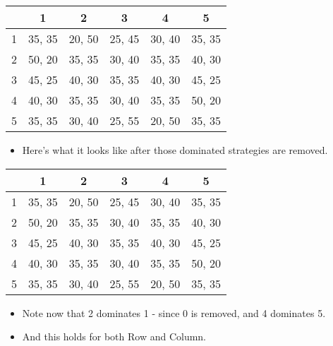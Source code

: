 \documentclass[
  ignorenonframetext,
]{beamer}
\providecommand{\tightlist}{%
  \setlength{\itemsep}{0pt}\setlength{\parskip}{0pt}}
\begin{document}
\begin{frame}
\begin{table}[!h]
\centering
\begin{tabular}[t]{>{}r|ccccc}
\toprule
 & 1 & 2 & 3 & 4 & 5\\
\midrule
1 & 35, 35 & 20, 50 & 25, 45 & 30, 40 & 35, 35\\
2 & 50, 20 & 35, 35 & 30, 40 & 35, 35 & 40, 30\\
3 & 45, 25 & 40, 30 & 35, 35 & 40, 30 & 45, 25\\
4 & 40, 30 & 35, 35 & 30, 40 & 35, 35 & 50, 20\\
5 & 35, 35 & 30, 40 & 25, 55 & 20, 50 & 35, 35\\
\bottomrule
\end{tabular}
\end{table}

\begin{itemize}
\tightlist
\item
  Here's what it looks like after those dominated strategies are
  removed.
\end{itemize}
\end{frame}

\begin{frame}
\begin{table}[!h]
\centering
\begin{tabular}[t]{>{}r|ccccc}
\toprule
 & 1 & 2 & 3 & 4 & 5\\
\midrule
1 & 35, 35 & 20, 50 & 25, 45 & 30, 40 & 35, 35\\
2 & 50, 20 & 35, 35 & 30, 40 & 35, 35 & 40, 30\\
3 & 45, 25 & 40, 30 & 35, 35 & 40, 30 & 45, 25\\
4 & 40, 30 & 35, 35 & 30, 40 & 35, 35 & 50, 20\\
5 & 35, 35 & 30, 40 & 25, 55 & 20, 50 & 35, 35\\
\bottomrule
\end{tabular}
\end{table}

\begin{itemize}
\tightlist
\item
  Note now that 2 dominates 1 - since 0 is removed, and 4 dominates 5.
\item
  And this holds for both Row and Column.
\end{itemize}
\end{frame}
\end{document}
